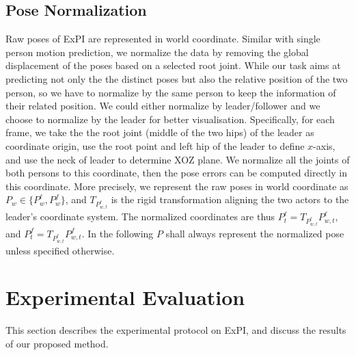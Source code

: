 \vspace{7mm}
\subsection{Pose Normalization}
\label{sec:norm}
Raw poses of ExPI are represented in world coordinate. Similar with single person motion prediction, we normalize the data by removing the global displacement of the poses based on a selected root joint.
While our task aims at predicting not only the the distinct poses but also the relative position of the two person, so 
we have to normalize by the same person to keep the information of their related position. We could either normalize by leader/follower and we choose to normalize by the leader for better visualisation.
Specifically, for each frame, we take the the root joint (middle of the two hips) of the leader as coordinate origin, use the root point and left hip of the leader to define $x$-axis, and use the neck of leader to determine XOZ plane. We normalize all the joints of both persons to this coordinate, then the pose errors can be computed directly in this coordinate. More precisely,
we represent the raw poses in world coordinate as $P_w \in \{{P}^{\ell}_w, {P}^{f}_w\}$, and $T_{{P}^{\ell}_{w,t}}$ is the rigid transformation aligning the two actors to the leader's coordinate system. The normalized coordinates are thus  $P^\ell_t = T_{{P}^{\ell}_{w,t}}{P}^{\ell}_{w,t}$,  and $P^f_t = T_{{P}^{\ell}_{w,t}}{P}^{f}_{w,t}$. In the following $P$ shall always represent the normalized pose unless specified otherwise.

\vspace{-2mm}
\section{Experimental Evaluation}
This section describes the experimental protocol on ExPI, and discuss the results of our proposed method.

